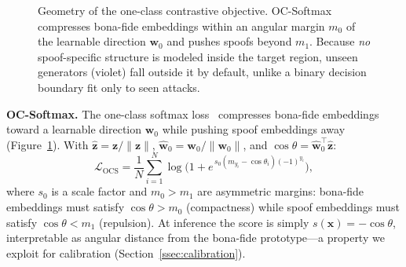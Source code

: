 \begin{figure}[t]
\centering
{}
\caption{Geometry of the one-class contrastive objective. OC-Softmax compresses
bona-fide embeddings within an angular margin $m_0$ of the learnable direction
$\mathbf{w}_0$ and pushes spoofs beyond $m_1$. Because \emph{no} spoof-specific
structure is modeled inside the target region, unseen generators (violet) fall outside
it by default, unlike a binary decision boundary fit only to seen attacks.}
\label{fig:oneclass}
\end{figure}

\noindent\textbf{OC-Softmax.} The one-class softmax loss~\cite{zhang2021oneclass}
compresses bona-fide embeddings toward a learnable direction $\mathbf{w}_0$ while
pushing spoof embeddings away (Figure~\ref{fig:oneclass}). With
$\hat{\mathbf{z}} = \mathbf{z}/\lVert\mathbf{z}\rVert$,
$\hat{\mathbf{w}}_0 = \mathbf{w}_0/\lVert\mathbf{w}_0\rVert$, and
$\cos\theta = \hat{\mathbf{w}}_0^\top \hat{\mathbf{z}}$:
\begin{equation}
\mathcal{L}_{\text{OCS}} = \frac{1}{N}\sum_{i=1}^{N} \log\!\Big(1 +
  e^{\,s_0 (m_{y_i} - \cos\theta_i)(-1)^{y_i}}\Big),
\label{eq:ocs}
\end{equation}
where $s_0$ is a scale factor and $m_0 > m_1$ are asymmetric margins: bona-fide
embeddings must satisfy $\cos\theta > m_0$ (compactness) while spoof embeddings must
satisfy $\cos\theta < m_1$ (repulsion). At inference the score is simply
$s(\mathbf{x}) = -\cos\theta$, interpretable as angular distance from the bona-fide
prototype---a property we exploit for calibration (Section~\ref{ssec:calibration}).

